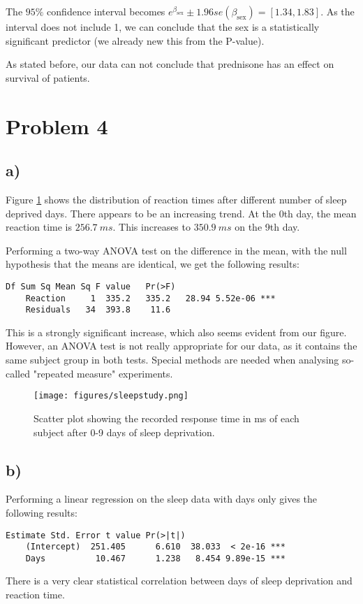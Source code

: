 \documentclass[a4paper, twocolumn]{article}
\renewcommand{\exp}{e^}
\begin{document}
The $95\%$ confidence interval becomes $\exp{\beta_\mathrm{sex}} \pm 1.96 se(\beta_\mathrm{sex}) = [1.34, 1.83]$. As the interval does not include 1, we can conclude that the sex is a statistically significant predictor (we already new this from the P-value).

As stated before, our data can not conclude that prednisone has an effect on survival of patients.


\section*{Problem 4}
\subsection*{a)}
Figure \ref{fig:sleepstudy} shows the distribution of reaction times after different number of sleep deprived days. There appears to be an increasing trend. At the 0th day, the mean reaction time is $\SI{256.7}{ms}$. This increases to $\SI{350.9}{ms}$ on the 9th day.

Performing a two-way ANOVA test on the difference in the mean, with the null hypothesis that the means are identical, we get the following results: 
\begin{Verbatim}[fontsize=\scriptsize]
                Df Sum Sq Mean Sq F value   Pr(>F)    
    Reaction     1  335.2   335.2   28.94 5.52e-06 ***
    Residuals   34  393.8    11.6           
\end{Verbatim}

This is a strongly significant increase, which also seems evident from our figure. However, an ANOVA test is not really appropriate for our data, as it contains the same subject group in both tests. Special methods are needed when analysing so-called "repeated measure" experiments.



\begin{figure}[h!]
    \centering
    \texttt{[image: figures/sleepstudy.png]}
    \caption{Scatter plot showing the recorded response time in ms of each subject after 0-9 days of sleep deprivation.}
    \label{fig:sleepstudy}
\end{figure}


\subsection*{b)}
Performing a linear regression on the sleep data with days only gives the following results:
\begin{Verbatim}[fontsize=\scriptsize]
                Estimate Std. Error t value Pr(>|t|)    
    (Intercept)  251.405      6.610  38.033  < 2e-16 ***
    Days          10.467      1.238   8.454 9.89e-15 ***
\end{Verbatim}
There is a very clear statistical correlation between days of sleep deprivation and reaction time.
\end{document}
